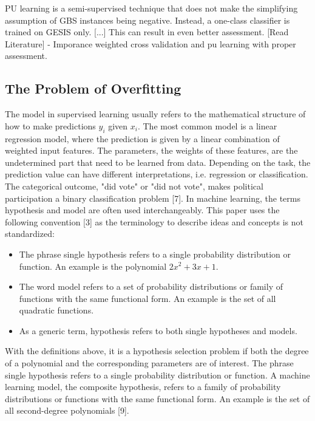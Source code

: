 PU learning is a semi-supervised technique that does not make the simplifying assumption of GBS instances being negative. Instead, a one-class classifier is trained on GESIS only. [...] This can result in even better assessment. [Read Literature] - Imporance weighted cross validation and pu learning with proper assessment.

\subsection{The Problem of Overfitting}

The model in supervised learning usually refers to the mathematical structure of how to make predictions \(y_i\) given \(x_i\). The most common model is a linear regression model, where the prediction is given by a linear combination of weighted input features. The parameters, the weights of these features, are the undetermined part that need to be learned from data. Depending on the task, the prediction value can have different interpretations, i.e. regression or classiﬁcation. The categorical outcome, "did vote" or "did not vote", makes political participation a binary classiﬁcation problem [7]. In machine learning, the terms hypothesis and model are often used interchangeably. This paper uses the following convention [3] as the terminology to describe ideas and concepts is not standardized:

\begin{itemize}
\item The phrase single hypothesis refers to a single probability distribution or function. An example is the polynomial \(2x^2 + 3x + 1\).

\item The word model refers to a set of probability distributions or family of functions with the same functional form. An example is the set of all quadratic functions.

\item As a generic term, hypothesis refers to both single hypotheses and models.
\end{itemize}

With the deﬁnitions above, it is a hypothesis selection problem if both the degree of a polynomial and the corresponding parameters are of interest. The phrase single hypothesis refers to a single probability distribution or function. A machine learning model, the composite hypothesis, refers to a family of probability distributions or functions with the same functional form. An example is the set of all second-degree polynomials [9].

